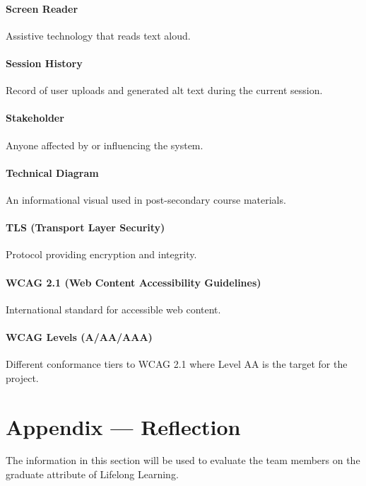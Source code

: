 \documentclass[12pt, titlepage]{article}
\begin{document}
\paragraph*{Screen Reader}
Assistive technology that reads text aloud.

\paragraph*{Session History}
Record of user uploads and generated alt text during the current session.

\paragraph*{Stakeholder}
Anyone affected by or influencing the system.

\paragraph*{Technical Diagram}
An informational visual used in post-secondary course materials.

\paragraph*{TLS (Transport Layer Security)}
Protocol providing encryption and integrity.

\paragraph*{WCAG 2.1 (Web Content Accessibility Guidelines)}
International standard for accessible web content.

\paragraph*{WCAG Levels (A/AA/AAA)}
Different conformance tiers to WCAG 2.1 where Level AA is the target
for the project.

\newpage{}
\section*{Appendix --- Reflection}


The information in this section will be used to evaluate the team members on the
graduate attribute of Lifelong Learning.


\end{document}

